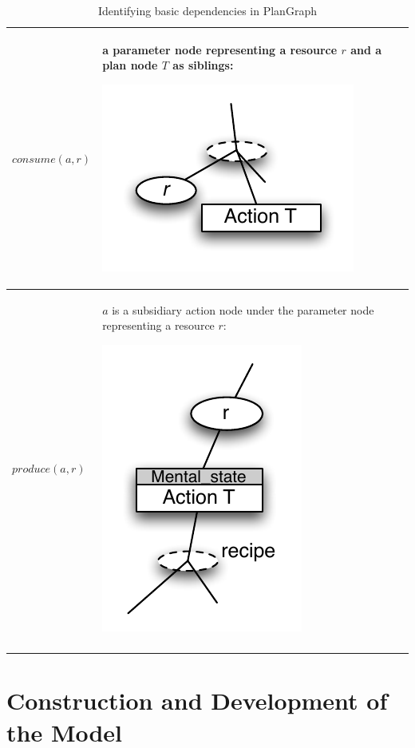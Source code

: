 \begin{center}
\begin{longtable}{|p{4.5cm}|p{8.5cm}|}
\hline
$consume(a, r)$ & a parameter node representing a resource $r$ and  a plan node $T$ as siblings: \par \includegraphics[scale=0.6]{use.pdf}\\
\hline
$produce(a, r)$ &  $a$ is a subsidiary action node under the parameter node representing a resource $r$: \par \includegraphics[scale=0.6]{generate.pdf}\\
\hline
\caption{Identifying basic dependencies in PlanGraph}
\label{tab:basic_deps_pg}
\end{longtable}
\end{center}

\section{Construction and Development of the Model} %
\label{sec:construction_and_development_of_the_model}
